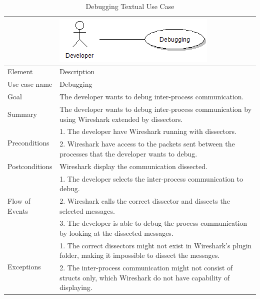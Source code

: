 \begin{table}[htbp] \footnotesize \center
\caption{Debugging Textual Use Case\label{tab:textual:debugging}}
\begin{tabularx}{\textwidth}{l X}
	 & \includegraphics[scale=0.8]{./planning/img/uc_debugging} \\
	\toprule
	Element & Description\\
	\midrule
	Use case name & Debugging\\
	Goal & The developer wants to debug inter-process communication.\\
	Summary & The developer wants to debug inter-process communication by using Wireshark extended by dissectors. \\
	\multirow{2}{*}{Preconditions} & 1. The developer have Wireshark running with dissectors.\\
	& 2. Wireshark have access to the packets sent between the processes that the developer wants to debug. \\
	Postconditions & Wireshark display the communication dissected.\\
	\midrule
	\multirow{3}{*}{Flow of Events} & 1. The developer selects the inter-process communication to debug. \\
	& 2. Wireshark calls the correct dissector and dissects the selected messages. \\
	& 3. The developer is able to debug the process communication by looking at the dissected messages. \\
	\midrule
	\multirow{2}{*}{Exceptions} & 1. The correct dissectors might not exist in Wireshark's plugin folder, making it impossible to dissect the messages. \\
	& 2. The inter-process communication might not consist of structs only, which Wireshark do not have capability of displaying. \\
	\bottomrule
\end{tabularx}
\end{table}

